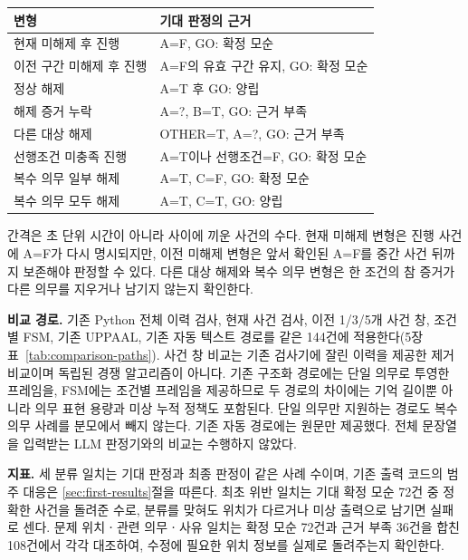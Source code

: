 \begin{revision}
\begin{table}[t]
\centering
\color{revisionblue}
\label{tab:scenario-variants}
\scriptsize
\begin{tabularx}{\columnwidth}{L{.45\columnwidth}Y}
\toprule
변형 & 기대 판정의 근거 \\
\midrule
현재 미해제 후 진행 & A=F, GO: 확정 모순 \\
이전 구간 미해제 후 진행 & A=F의 유효 구간 유지, GO: 확정 모순 \\
정상 해제 & A=T 후 GO: 양립 \\
해제 증거 누락 & A=?, B=T, GO: 근거 부족 \\
다른 대상 해제 & OTHER=T, A=?, GO: 근거 부족 \\
선행조건 미충족 진행 & A=T이나 선행조건=F, GO: 확정 모순 \\
복수 의무 일부 해제 & A=T, C=F, GO: 확정 모순 \\
복수 의무 모두 해제 & A=T, C=T, GO: 양립 \\
\bottomrule
\end{tabularx}
\end{table}

간격은 초 단위 시간이 아니라 사이에 끼운 사건의 수다. 현재 미해제 변형은 진행 사건에 A=F가 다시 명시되지만, 이전 미해제 변형은 앞서 확인된 A=F를 중간 사건 뒤까지 보존해야 판정할 수 있다. 다른 대상 해제와 복수 의무 변형은 한 조건의 참 증거가 다른 의무를 지우거나 남기지 않는지 확인한다.

\textbf{비교 경로.} 기존 Python 전체 이력 검사, 현재 사건 검사, 이전 1/3/5개 사건 창, 조건별 FSM, 기존 UPPAAL, 기존 자동 텍스트 경로를 같은 144건에 적용한다(5장 표~\ref{tab:comparison-paths}). 사건 창 비교는 기존 검사기에 잘린 이력을 제공한 제거 비교이며 독립된 경쟁 알고리즘이 아니다. 기존 구조화 경로에는 단일 의무로 투영한 프레임을, FSM에는 조건별 프레임을 제공하므로 두 경로의 차이에는 기억 길이뿐 아니라 의무 표현 용량과 미상 누적 정책도 포함된다. 단일 의무만 지원하는 경로도 복수 의무 사례를 분모에서 빼지 않는다. 기존 자동 경로에는 원문만 제공했다. 전체 문장열을 입력받는 LLM 판정기와의 비교는 수행하지 않았다.

\textbf{지표.} 세 분류 일치는 기대 판정과 최종 판정이 같은 사례 수이며, 기존 출력 코드의 범주 대응은 \ref{sec:first-results}절을 따른다. 최초 위반 일치는 기대 확정 모순 72건 중 정확한 사건을 돌려준 수로, 분류를 맞혀도 위치가 다르거나 미상 출력으로 남기면 실패로 센다. 문제 위치ㆍ관련 의무ㆍ사유 일치는 확정 모순 72건과 근거 부족 36건을 합친 108건에서 각각 대조하여, 수정에 필요한 위치 정보를 실제로 돌려주는지 확인한다.


\end{revision}

